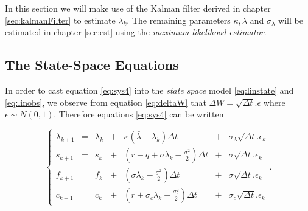 \documentclass{article}
\theoremstyle{definition}
\theoremstyle{remark}
\begin{document}
In this section we will make use of the Kalman filter derived in chapter \ref{sec:kalmanFilter} to estimate $\lambda_k$. The remaining parameters $\kappa,\bar{\lambda}$ and $\sigma_\lambda$ will be estimated in chapter \ref{sec:est} using the \emph{maximum likelihood estimator}.








\subsection{The State-Space Equations}
In order to cast equation \eqref{eq:sys4} into the \textit{state space} model \eqref{eq:linstate} and \eqref{eq:linobs}, we observe from equation \eqref{eq:deltaW} that $\Delta W =\sqrt{\Delta t}.\epsilon$ where $\epsilon \sim N(0,1)$. Therefore equations \eqref{eq:sys4} can be written


\begin{equation}\label{eq:sys5}
\left\{ \begin{array}{lcrcrcr}
			\lambda_{k+1} & = & \lambda_k &+& \kappa(\bar{\lambda}-\lambda_k)\Delta t & + & \sigma_\lambda \sqrt{\Delta t}.\epsilon_k\\
			s_{k+1} & = & s_k &+& (r-q+\sigma\lambda_k-\frac{\sigma^2}{2}) \Delta t & + & \sigma  \sqrt{\Delta t}.\epsilon_k \\ 
			f_{k+1} & = & f_k &+& (\sigma\lambda_k-\frac{\sigma^2}{2}) \Delta t & + & \sigma  \sqrt{\Delta t}.\epsilon_k \\ 
			c_{k+1} & = & c_k &+& (r+\sigma_c\lambda_k-\frac{\sigma_c^2}{2})\Delta t &+& \sigma_c \sqrt{\Delta t}.\epsilon_k 
        \end{array} \right. .
\end{equation}
\end{document}
